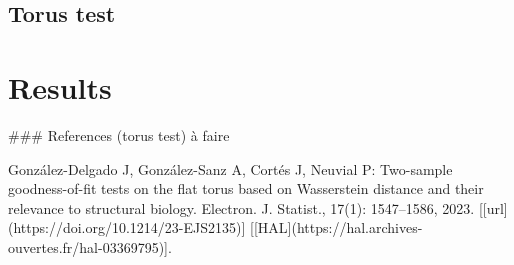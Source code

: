 \documentclass{article}
\begin{document}
\subsection{Torus test}



\section{Results}






### References (torus test) à faire

González-Delgado J, González-Sanz A, Cortés J, Neuvial P: Two-sample goodness-of-fit tests on the flat torus based on Wasserstein distance and their relevance to structural biology. Electron. J. Statist., 17(1): 1547–1586, 2023. [[url](https://doi.org/10.1214/23-EJS2135)] [[HAL](https://hal.archives-ouvertes.fr/hal-03369795)].
\end{document}
